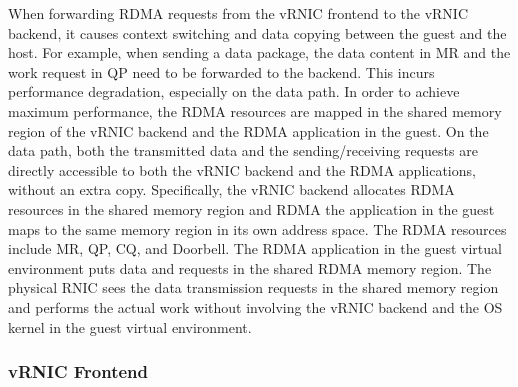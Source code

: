 When forwarding RDMA requests from the vRNIC frontend to the vRNIC backend, it causes context switching and data copying between the guest and the host. For example, when sending a data package, the data content in MR and the work request in QP need to be forwarded to the backend. This incurs performance degradation, especially on the data path. In order to achieve maximum performance, the RDMA resources are mapped in the shared memory region of the vRNIC backend and the RDMA application in the guest. On the data path, both the transmitted data and the sending/receiving requests are directly accessible to both the vRNIC backend and the RDMA applications, without an extra copy. Specifically, the vRNIC backend allocates RDMA resources in the shared memory region and RDMA the application in the guest maps to the same memory region in its own address space. The RDMA resources include MR, QP, CQ, and Doorbell. The RDMA application in the guest virtual environment puts data and requests in the shared RDMA memory region. The physical RNIC sees the data transmission requests in the shared memory region and performs the actual work without involving the vRNIC backend and the OS kernel in the guest virtual environment.

\subsubsection{vRNIC Frontend}

